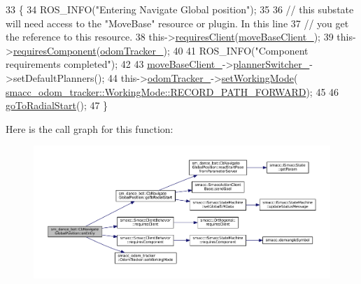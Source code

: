 \begin{DoxyCode}
33   \{
34     ROS\_INFO(\textcolor{stringliteral}{"Entering Navigate Global position"});
35 
36     \textcolor{comment}{// this substate will need access to the "MoveBase" resource or plugin. In this line}
37     \textcolor{comment}{// you get the reference to this resource.}
38     this->\hyperlink{classsmacc_1_1SmaccClientBehavior_adc21bbd45d36bd81ca6f778ed161807a}{requiresClient}(\hyperlink{classsm__dance__bot_1_1CbNavigateGlobalPosition_a1d94ab79bdffa994748287c09bd8c18e}{moveBaseClient\_});
39     this->\hyperlink{classsmacc_1_1SmaccClientBehavior_a011246bb1424f8bf8c9322f652db9d88}{requiresComponent}(\hyperlink{classsm__dance__bot_1_1CbNavigateGlobalPosition_a1d9fbebe8579cdef9485698e99ca8a41}{odomTracker\_});
40 
41     ROS\_INFO(\textcolor{stringliteral}{"Component requirements completed"});
42 
43     \hyperlink{classsm__dance__bot_1_1CbNavigateGlobalPosition_a1d94ab79bdffa994748287c09bd8c18e}{moveBaseClient\_}->\hyperlink{classsmacc_1_1ClMoveBaseZ_a1a20609e1b4a9406cd6cece0d74acfe5}{plannerSwitcher\_}->setDefaultPlanners();
44     this->\hyperlink{classsm__dance__bot_1_1CbNavigateGlobalPosition_a1d9fbebe8579cdef9485698e99ca8a41}{odomTracker\_}->\hyperlink{classsmacc__odom__tracker_1_1OdomTracker_a38fbca999297c46dc95628cc60851a45}{setWorkingMode}(
      \hyperlink{namespacesmacc__odom__tracker_ade9730dd5cc10ccfad9362176cf46c33a989d06a586bcf9520889228da7faa643}{smacc\_odom\_tracker::WorkingMode::RECORD\_PATH\_FORWARD});
45 
46     \hyperlink{classsm__dance__bot_1_1CbNavigateGlobalPosition_a0832f7a7f205cc483be012aef9501312}{goToRadialStart}();
47   \}
\end{DoxyCode}


Here is the call graph for this function\+:
\nopagebreak
\begin{figure}[H]
\begin{center}
\leavevmode
\includegraphics[width=350pt]{classsm__dance__bot_1_1CbNavigateGlobalPosition_a281fe5c962ca5004f44e929159991c6a_cgraph}
\end{center}
\end{figure}


